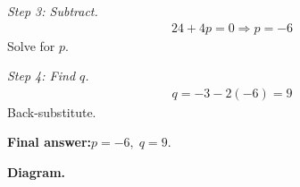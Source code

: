 \documentclass[11pt]{article}
\begin{document}
\textit{Step 3: Subtract.}
\[\begin{gathered}
24 + 4p = 0 \Rightarrow p = -6
\end{gathered}\]
Solve for \( p \).

\textit{Step 4: Find \( q \).}
\[\begin{gathered}
q = -3 - 2(-6) = 9
\end{gathered}\]
Back-substitute.

\begin{answerbox}
\textbf{Final answer:}\quad \(\displaystyle  p = -6,\; q = 9 \).
\end{answerbox}
\textbf{Diagram.}

\begin{center}
\end{center}
\end{document}
